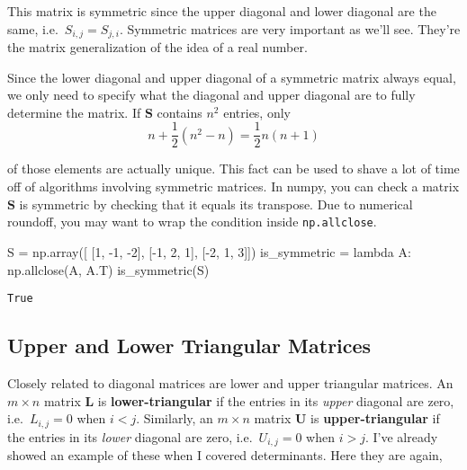 \documentclass[
  letterpaper,
  DIV=11,
  numbers=noendperiod]{scrreprt}
\newenvironment{Shaded}{\begin{snugshade}}{\end{snugshade}}
\newcommand{\DecValTok}[1]{\textcolor[rgb]{0.68,0.00,0.00}{#1}}
\newcommand{\KeywordTok}[1]{\textcolor[rgb]{0.00,0.23,0.31}{#1}}
\newcommand{\NormalTok}[1]{\textcolor[rgb]{0.00,0.23,0.31}{#1}}
\newcommand{\OperatorTok}[1]{\textcolor[rgb]{0.37,0.37,0.37}{#1}}
\begin{document}
This matrix is symmetric since the upper diagonal and lower diagonal are
the same, i.e.~\(S_{i,j} = S_{j,i}\). Symmetric matrices are very
important as we'll see. They're the matrix generalization of the idea of
a real number.

Since the lower diagonal and upper diagonal of a symmetric matrix always
equal, we only need to specify what the diagonal and upper diagonal are
to fully determine the matrix. If \(\mathbf{S}\) contains \(n^2\)
entries, only \[n + \frac{1}{2}(n^2 - n) = \frac{1}{2}n(n+1)\]

of those elements are actually unique. This fact can be used to shave a
lot of time off of algorithms involving symmetric matrices. In numpy,
you can check a matrix \(\mathbf{S}\) is symmetric by checking that it
equals its transpose. Due to numerical roundoff, you may want to wrap
the condition inside \texttt{np.allclose}.

\begin{Shaded}
\begin{Highlighting}[]
\NormalTok{S }\OperatorTok{=}\NormalTok{ np.array([}
\NormalTok{    [}\DecValTok{1}\NormalTok{, }\OperatorTok{{-}}\DecValTok{1}\NormalTok{, }\OperatorTok{{-}}\DecValTok{2}\NormalTok{],}
\NormalTok{    [}\OperatorTok{{-}}\DecValTok{1}\NormalTok{, }\DecValTok{2}\NormalTok{, }\DecValTok{1}\NormalTok{],}
\NormalTok{    [}\OperatorTok{{-}}\DecValTok{2}\NormalTok{, }\DecValTok{1}\NormalTok{, }\DecValTok{3}\NormalTok{]])}
\NormalTok{is\_symmetric }\OperatorTok{=} \KeywordTok{lambda}\NormalTok{ A: np.allclose(A, A.T)}
\NormalTok{is\_symmetric(S)}
\end{Highlighting}
\end{Shaded}

\begin{verbatim}
True
\end{verbatim}

\hypertarget{upper-and-lower-triangular-matrices}{%
\subsection{Upper and Lower Triangular
Matrices}\label{upper-and-lower-triangular-matrices}}

Closely related to diagonal matrices are lower and upper triangular
matrices. An \(m \times n\) matrix \(\mathbf{L}\) is
\textbf{lower-triangular} if the entries in its \emph{upper} diagonal
are zero, i.e.~\(L_{i,j} = 0\) when \(i < j\). Similarly, an
\(m \times n\) matrix \(\mathbf{U}\) is \textbf{upper-triangular} if the
entries in its \emph{lower} diagonal are zero, i.e.~\(U_{i,j} = 0\) when
\(i > j\). I've already showed an example of these when I covered
determinants. Here they are again,
\end{document}
